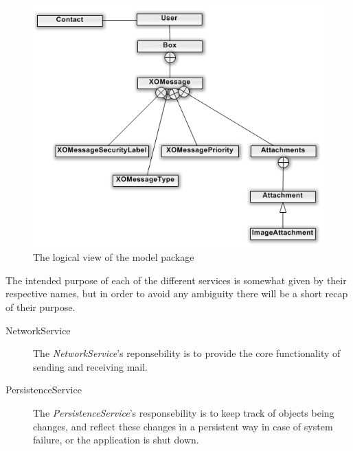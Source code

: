 \begin{figure}[H]
	\includegraphics[width=\textwidth]{modelPackage.png}
	\caption{The logical view of the model package}
	\label{fig:logicalmodelpackview}
\end{figure}

The intended purpose of each of the different services is somewhat given by their respective names, but in order to avoid any ambiguity there will be a short recap of their purpose.
\begin{description}
	\item[NetworkService] The \textit{NetworkService}'s reponsebility is to provide the core functionality of sending and receiving mail. 
	\item[PersistenceService] The \textit{PersistenceService}'s responsebility is to keep track of objects being changes, and reflect these changes in a persistent way in case of system failure, or the application is shut down. 
\end{description}

